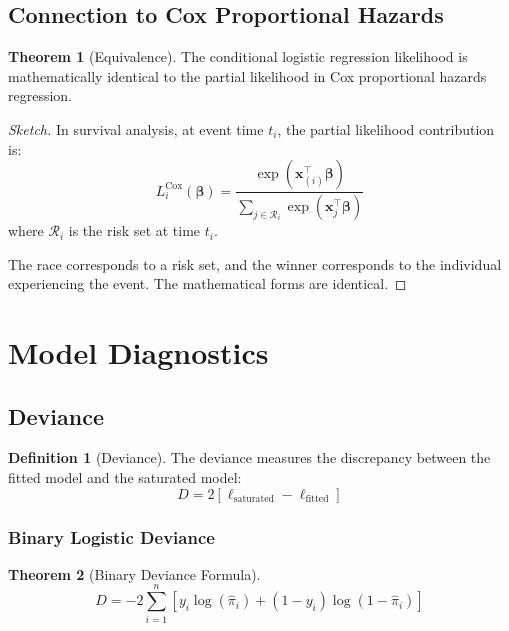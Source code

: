 \documentclass[11pt,letterpaper]{article}
\theoremstyle{definition}
\newtheorem{definition}{Definition}[section]
\newtheorem{theorem}{Theorem}[section]
\newcommand{\bb}{\boldsymbol{\beta}}
\begin{document}
\subsection{Connection to Cox Proportional Hazards}

\begin{theorem}[Equivalence]
The conditional logistic regression likelihood is mathematically identical to the partial likelihood in Cox proportional hazards regression.
\end{theorem}

\begin{proof}[Sketch]
In survival analysis, at event time $t_i$, the partial likelihood contribution is:
\begin{equation}
    L_i^{\text{Cox}}(\bb) = \frac{\exp(\mathbf{x}_{(i)}^\top \bb)}{\sum_{j \in \mathcal{R}_i} \exp(\mathbf{x}_j^\top \bb)}
\end{equation}
where $\mathcal{R}_i$ is the risk set at time $t_i$.

The race corresponds to a risk set, and the winner corresponds to the individual experiencing the event. The mathematical forms are identical.
\end{proof}

\section{Model Diagnostics}

\subsection{Deviance}

\begin{definition}[Deviance]
The deviance measures the discrepancy between the fitted model and the saturated model:
\begin{equation}
    D = 2[\ell_{\text{saturated}} - \ell_{\text{fitted}}]
\end{equation}
\end{definition}

\subsubsection{Binary Logistic Deviance}

\begin{theorem}[Binary Deviance Formula]
\begin{equation}
    D = -2 \sum_{i=1}^{n} \left[ y_i \log(\hat{\pi}_i) + (1-y_i) \log(1-\hat{\pi}_i) \right]
    \label{eq:binary-deviance}
\end{equation}
\end{theorem}
\end{document}

